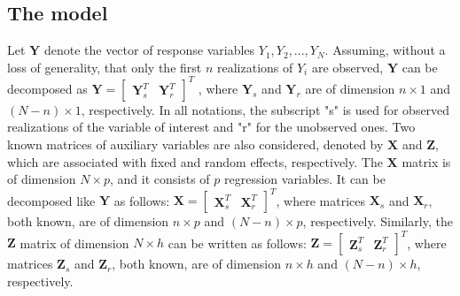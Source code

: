 \subsection{The model}
Let $\mathbf{Y}$ denote the vector of response variables $Y_1, Y_2,..., Y_N$. Assuming, without a loss of generality, that only the first $n$ realizations of $Y_i$ are observed, $\mathbf{Y}$ can be decomposed as $\mathbf{Y}=
\begin{bmatrix}
	\mathbf{Y}_s^T & \mathbf{Y}_r^T
\end{bmatrix}^T$ ,
where $\mathbf{Y}_s$ and $\mathbf{Y}_r$ are of dimension $n \times 1$ and $(N - n) \times 1$, respectively. In all notations, the subscript "s" is used for observed realizations of the variable of interest and "r" for the unobserved ones. Two known matrices of auxiliary variables are also considered, denoted by $\mathbf{X}$ and $\mathbf{Z}$, which are associated with fixed and random effects, respectively. The $\mathbf{X}$ matrix is of dimension $N \times p$, and it consists of $p$ regression variables. It can be decomposed like $\mathbf{Y}$ as follows: $\mathbf{X}=
\begin{bmatrix}
	\mathbf{X}_s^T & \mathbf{X}_r^T
\end{bmatrix}^T$,
where matrices $\mathbf{X}_s$ and $\mathbf{X}_r$, both known, are of dimension $n \times p$ and $(N-n) \times p$, respectively. Similarly, the $\mathbf{Z}$ matrix of dimension $N \times h$ can be written as follows: $\mathbf{Z}=
\begin{bmatrix}
	\mathbf{Z}_s^T & \mathbf{Z}_r^T
\end{bmatrix}^T$,
where matrices $\mathbf{Z}_s$ and $\mathbf{Z}_r$, both known, are of dimension $n \times h$ and $(N-n) \times h$, respectively.

